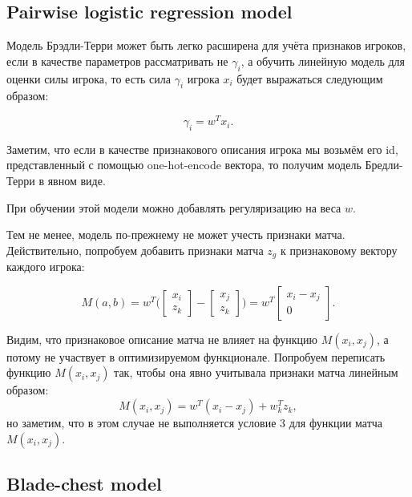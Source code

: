 \documentclass[12pt,a4paper]{article}
\begin{document}
\subsection{Pairwise logistic regression model}

Модель Брэдли-Терри может быть легко расширена для учёта признаков игроков, если в качестве параметров рассматривать не $\gamma_i$, а обучить линейную модель для оценки силы игрока, то есть сила $\gamma_i$ игрока $x_i$ будет выражаться следующим образом:

\begin{equation*}
	\gamma_i = w^T x_i.
\end{equation*}

Заметим, что если в качестве признакового описания игрока мы возьмём его id, представленный с помощью one-hot-encode вектора, то получим модель Бредли-Терри в явном виде.

При обучении этой модели можно добавлять регуляризацию на веса $w$.

Тем не менее, модель по-прежнему не может учесть признаки матча. Действительно, попробуем добавить признаки матча $z_g$ к признаковому вектору каждого игрока:

\begin{equation*}
	M(a,b) = w^T\bigg(
	\begin{bmatrix}
	x_i\\
	z_k
	\end{bmatrix}
	-
	\begin{bmatrix}
	x_j\\
	z_k
	\end{bmatrix}
	 \bigg)
	= 
	w^T
	\begin{bmatrix}
	x_i - x_j\\
	0
	\end{bmatrix}.
\end{equation*}

Видим, что признаковое описание матча не влияет на функцию $M(x_i, x_j)$, а потому не участвует в оптимизируемом функционале. Попробуем переписать функцию $M(x_i, x_j)$ так, чтобы она явно учитывала признаки матча линейным образом: 
$$M(x_i, x_j) = w^T(x_i - x_j) + w_k^T z_k,$$
но заметим, что в этом случае не выполняется условие 3 для функции матча~$M(x_i, x_j)$.

\subsection{Blade-chest model}
\end{document}
